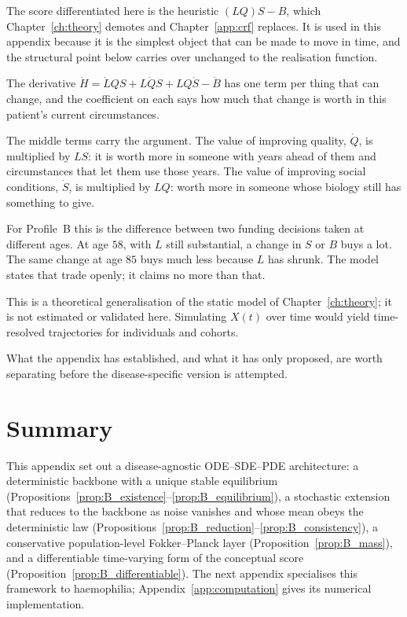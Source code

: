 \begin{reading}
The score differentiated here is the heuristic $(LQ)S-B$, which
Chapter~\ref{ch:theory} demotes and Chapter~\ref{app:crf} replaces. It is used
in this appendix because it is the simplest object that can be made to move in
time, and the structural point below carries over unchanged to the
realisation function.

The derivative $\dot H=\dot LQS+L\dot QS+LQ\dot S-\dot B$ has one term per
thing that can change, and the coefficient on each says how much that change is
worth in this patient's current circumstances.

The middle terms carry the argument. The value of improving quality, $\dot Q$,
is multiplied by $LS$: it is worth more in someone with years ahead of them and
circumstances that let them use those years. The value of improving social
conditions, $\dot S$, is multiplied by $LQ$: worth more in someone whose
biology still has something to give.

For Profile~B this is the difference between two funding decisions taken at
different ages. At age $58$, with $L$ still substantial, a change in $S$ or $B$
buys a lot. The same change at age $85$ buys much less because $L$ has shrunk.
The model states that trade openly; it claims no more than that.
\end{reading}

This is a theoretical generalisation of the static model of
Chapter~\ref{ch:theory}; it is not estimated or validated here. Simulating
$X(t)$ over time would yield time-resolved trajectories for individuals and
cohorts.

What the appendix has established, and what it has only proposed, are worth
separating before the disease-specific version is attempted.

\section{Summary}
\label{sec:B_summary}
This appendix set out a disease-agnostic ODE--SDE--PDE architecture: a
deterministic backbone with a unique stable equilibrium
(Propositions~\ref{prop:B_existence}--\ref{prop:B_equilibrium}), a stochastic
extension that reduces to the backbone as noise vanishes and whose mean obeys the
deterministic law (Propositions~\ref{prop:B_reduction}--\ref{prop:B_consistency}),
a conservative population-level Fokker--Planck layer
(Proposition~\ref{prop:B_mass}), and a differentiable time-varying form of the
conceptual score (Proposition~\ref{prop:B_differentiable}). The next appendix
specialises this framework to haemophilia; Appendix~\ref{app:computation} gives
its numerical implementation.

